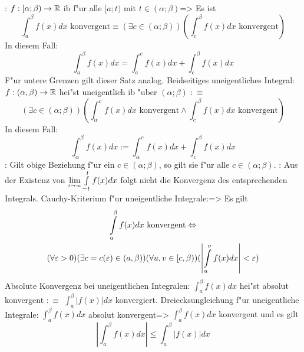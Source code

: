 \lessertheorem: $f:[\alpha;\beta)\to\mathbb R$ ib f"ur alle 
  $[a;t)$ mit $t\in(\alpha;\beta)$=>
  {
  Es ist
  \[\int_a^\beta f(x)dx \text{ konvergent} \equiv
    (\exists c\in(\alpha;\beta))(\int_c^\beta f(x)dx \text{ konvergent})
    \]
  In diesem Fall:
  \[\int_a^\beta f(x)dx =\int_a^c f(x)dx+\int_c^\beta f(x)dx
    \]
  F"ur untere Grenzen gilt dieser Satz analog.
  }
 Beidseitiges uneigentliches Integral:{
  $f:(\alpha,\beta)\to\mathbb R$ hei"st uneigentlich ib "uber $(\alpha;\beta)$ 
  $:\equiv$
  \[(\exists c\in (\alpha;\beta))
      (\int_\alpha^c f(x)dx \text{ konvergent} \land 
       \int_c^\beta f(x)dx \text{ konvergent})
    \]
  In diesem Fall:
  \[\int_\alpha^\beta f(x)dx:=\int_\alpha^c f(x)dx+\int_c^\beta f(x)dx 
    \]
  }
\remark:{
  Gilt obige Beziehung f"ur ein $c\in(\alpha;\beta)$, so gilt sie f"ur alle
  $c\in(\alpha;\beta)$.
  }
\remark:{
  Aus der Existenz von $\limes t->\infty \int_{-t}^t f(x)dx$ folgt nicht
  die Konvergenz des entsprechenden Integrals.
  }
\theorem Cauchy-Kriterium f"ur uneigentliche Integrale:=>{
  Es gilt
  \begin{multline*}
    \int_a^\beta f(x)dx \text{ konvergent} \equiv \\
    \epsn(\exists c=c(\epsilon)\in(a,\beta))(\forall u,v \in [c,\beta))
      (\left|\int_u^v f(x)dx\right| <\epsilon)
    \end{multline*}
  }
 Absolute Konvergenz bei uneigentlichen Integralen:{
  $\int_a^\beta f(x)dx$ hei"st absolut konvergent $:\equiv$ 
  $\int_a^\beta |f(x)| dx$ konvergiert.
  }
\theorem Dreiecksungleichung f"ur uneigentliche Integrale:
  $\int_a^\beta f(x)dx$ absolut konvergent=>{
  $\int_a^\beta f(x)dx$ konvergent und es gilt
  \[\left|\int_a^\beta f(x)dx\right|\le\int_a^\beta |f(x)|dx
    \]
  }
